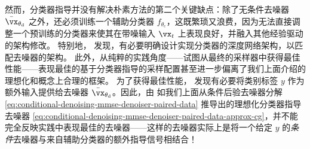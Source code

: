 \documentclass[../../book-main.tex]{subfiles}
\begin{document}

然而，分类器指导并没有解决朴素方法的第二个关键缺点：除了无条件去噪器 $\bar{\vx}_{\theta_{\mathrm{d}}}$ 之外，还必须训练一个辅助分类器 $f_{\theta_{\mathrm{c}}}$，这既繁琐又浪费，因为无法直接调整一个预训练的分类器来使其在带噪输入 $\vx_t$ 上表现良好，并融入其他经验驱动的架构修改。
特别地，\citet{Dhariwal2021-hg} 发现，有必要明确设计实现分类器的深度网络架构，以匹配去噪器的架构。
此外，从纯粹的实践角度——试图从最终的采样器中获得最佳性能——表现最佳的基于分类器指导的采样配置甚至进一步偏离了我们上面介绍的理想化和概念上合理的框架。
为了获得最佳性能，\citet{Dhariwal2021-hg} 发现有必要将类别标签 $y$ 作为额外输入提供给去噪器 $\bar{\vx}_{\theta_{\mathrm{d}}}$。因此，由 \citet{Dhariwal2021-hg} 如我们上面从条件后验去噪器分解 \eqref{eq:conditional-denoising-mmse-denoiser-paired-data} 推导出的理想化分类器指导去噪器 \eqref{eq:conditional-denoising-mmse-denoiser-paired-data-approx-cg}，并不能完全反映实践中表现最佳的去噪器——这样的去噪器实际上是将一个给定 $y$ 的\textit{条件}去噪器与来自辅助分类器的额外指导信号相结合！
\end{document}
